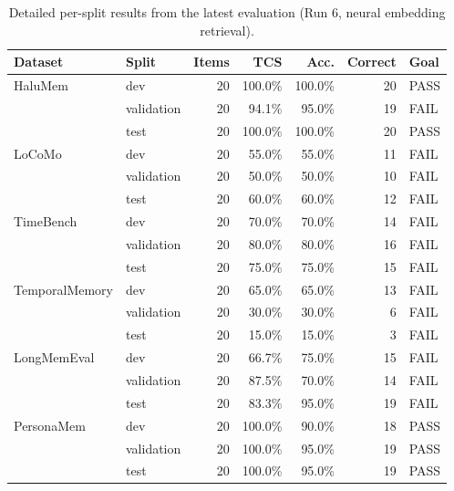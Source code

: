 \documentclass[11pt,a4paper]{article}
\begin{document}
\begin{table}[H]
\centering
\caption{Detailed per-split results from the latest evaluation (Run 6,
neural embedding retrieval).}
\label{tab:run6-splits}
\small
\begin{tabular}{llrrrrl}
\toprule
\textbf{Dataset} & \textbf{Split} & \textbf{Items} & \textbf{TCS} & \textbf{Acc.} & \textbf{Correct} & \textbf{Goal} \\
\midrule
HaluMem            & dev        & 20 & 100.0\% & 100.0\% & 20 & \textcolor{passgreen}{PASS} \\
                   & validation & 20 &  94.1\% &  95.0\% & 19 & FAIL \\
                   & test       & 20 & 100.0\% & 100.0\% & 20 & \textcolor{passgreen}{PASS} \\
\midrule
LoCoMo             & dev        & 20 &  55.0\% &  55.0\% & 11 & FAIL \\
                   & validation & 20 &  50.0\% &  50.0\% & 10 & FAIL \\
                   & test       & 20 &  60.0\% &  60.0\% & 12 & FAIL \\
\midrule
TimeBench          & dev        & 20 &  70.0\% &  70.0\% & 14 & FAIL \\
                   & validation & 20 &  80.0\% &  80.0\% & 16 & FAIL \\
                   & test       & 20 &  75.0\% &  75.0\% & 15 & FAIL \\
\midrule
TemporalMemory     & dev        & 20 &  65.0\% &  65.0\% & 13 & FAIL \\
                   & validation & 20 &  30.0\% &  30.0\% &  6 & FAIL \\
                   & test       & 20 &  15.0\% &  15.0\% &  3 & FAIL \\
\midrule
LongMemEval        & dev        & 20 &  66.7\% &  75.0\% & 15 & FAIL \\
                   & validation & 20 &  87.5\% &  70.0\% & 14 & FAIL \\
                   & test       & 20 &  83.3\% &  95.0\% & 19 & FAIL \\
\midrule
PersonaMem         & dev        & 20 & 100.0\% &  90.0\% & 18 & \textcolor{passgreen}{PASS} \\
                   & validation & 20 & 100.0\% &  95.0\% & 19 & \textcolor{passgreen}{PASS} \\
                   & test       & 20 & 100.0\% &  95.0\% & 19 & \textcolor{passgreen}{PASS} \\

\end{tabular}
\end{table}
\end{document}
